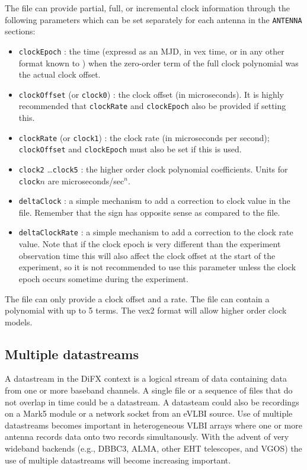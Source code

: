 \documentclass[12pt]{article}
\begin{document}
The \vd file can provide partial, full, or incremental clock information through the following parameters which can be set separately for each antenna in the {\tt ANTENNA} sections:
\begin{itemize}
\item {\tt clockEpoch} : the time (expressd as an MJD, in vex time, or in any other format known to \vexdifx) when the zero-order term of the full clock polynomial was the actual clock offset.
\item {\tt clockOffset} (or {\tt clock0}) : the clock offset (in microseconds).  It is highly recommended that {\tt clockRate} and {\tt clockEpoch} also be provided if setting this.
\item {\tt clockRate} (or {\tt clock1}) : the clock rate (in microseconds per second); {\tt clockOffset} and {\tt clockEpoch} must also be set if this is used.
\item {\tt clock2} \ldots {\tt clock5} : the higher order clock polynomial coefficients.  Units for {\tt clock}$n$ are microseconds/sec$^n$.
\item {\tt deltaClock} : a simple mechanism to add a correction to clock value in the \vx file.  Remember that the sign has opposite sense as compared to the \vx file.
\item {\tt deltaClockRate} : a simple mechanism to add a correction to the clock rate value.  Note that if the clock epoch is very different than the experiment observation time this will also affect the clock offset at the start of the experiment, so it is not recommended to use this parameter unless the clock epoch occurs sometime during the experiment.
\end{itemize}
The \vx file can only provide a clock offset and a rate.
The \vd file can contain a polynomial with up to 5 terms.
The vex2 format will allow higher order clock models.






\subsection{Multiple datastreams} \label{sec:mds}

A datastream in the DiFX context is a logical stream of data containing data from one or more baseband channels.
A single file or a sequence of files that do not overlap in time could be a datastream.  A datasteam could also be recordings on a Mark5 module or a network socket from an eVLBI source.
Use of multiple datastreams becomes important in heterogeneous VLBI arrays where one or more antenna records data onto two records simultanously.
With the advent of very wideband backends (e.g., DBBC3, ALMA, other EHT telescopes, and VGOS) the use of multiple datastreams will become increasing important.
\end{document}
